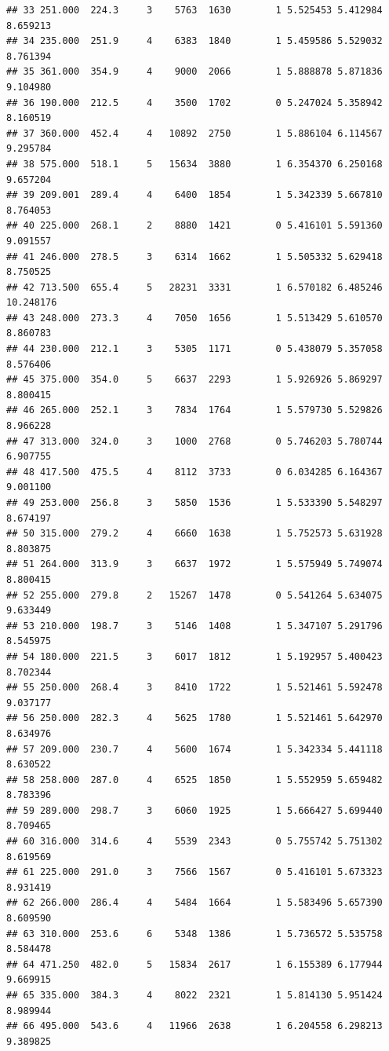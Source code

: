 \documentclass[
]{book}
\theoremstyle{definition}
\theoremstyle{definition}
\theoremstyle{definition}
\theoremstyle{definition}
\theoremstyle{remark}
\begin{document}
\begin{verbatim}
## 33 251.000  224.3     3    5763  1630        1 5.525453 5.412984  8.659213
## 34 235.000  251.9     4    6383  1840        1 5.459586 5.529032  8.761394
## 35 361.000  354.9     4    9000  2066        1 5.888878 5.871836  9.104980
## 36 190.000  212.5     4    3500  1702        0 5.247024 5.358942  8.160519
## 37 360.000  452.4     4   10892  2750        1 5.886104 6.114567  9.295784
## 38 575.000  518.1     5   15634  3880        1 6.354370 6.250168  9.657204
## 39 209.001  289.4     4    6400  1854        1 5.342339 5.667810  8.764053
## 40 225.000  268.1     2    8880  1421        0 5.416101 5.591360  9.091557
## 41 246.000  278.5     3    6314  1662        1 5.505332 5.629418  8.750525
## 42 713.500  655.4     5   28231  3331        1 6.570182 6.485246 10.248176
## 43 248.000  273.3     4    7050  1656        1 5.513429 5.610570  8.860783
## 44 230.000  212.1     3    5305  1171        0 5.438079 5.357058  8.576406
## 45 375.000  354.0     5    6637  2293        1 5.926926 5.869297  8.800415
## 46 265.000  252.1     3    7834  1764        1 5.579730 5.529826  8.966228
## 47 313.000  324.0     3    1000  2768        0 5.746203 5.780744  6.907755
## 48 417.500  475.5     4    8112  3733        0 6.034285 6.164367  9.001100
## 49 253.000  256.8     3    5850  1536        1 5.533390 5.548297  8.674197
## 50 315.000  279.2     4    6660  1638        1 5.752573 5.631928  8.803875
## 51 264.000  313.9     3    6637  1972        1 5.575949 5.749074  8.800415
## 52 255.000  279.8     2   15267  1478        0 5.541264 5.634075  9.633449
## 53 210.000  198.7     3    5146  1408        1 5.347107 5.291796  8.545975
## 54 180.000  221.5     3    6017  1812        1 5.192957 5.400423  8.702344
## 55 250.000  268.4     3    8410  1722        1 5.521461 5.592478  9.037177
## 56 250.000  282.3     4    5625  1780        1 5.521461 5.642970  8.634976
## 57 209.000  230.7     4    5600  1674        1 5.342334 5.441118  8.630522
## 58 258.000  287.0     4    6525  1850        1 5.552959 5.659482  8.783396
## 59 289.000  298.7     3    6060  1925        1 5.666427 5.699440  8.709465
## 60 316.000  314.6     4    5539  2343        0 5.755742 5.751302  8.619569
## 61 225.000  291.0     3    7566  1567        0 5.416101 5.673323  8.931419
## 62 266.000  286.4     4    5484  1664        1 5.583496 5.657390  8.609590
## 63 310.000  253.6     6    5348  1386        1 5.736572 5.535758  8.584478
## 64 471.250  482.0     5   15834  2617        1 6.155389 6.177944  9.669915
## 65 335.000  384.3     4    8022  2321        1 5.814130 5.951424  8.989944
## 66 495.000  543.6     4   11966  2638        1 6.204558 6.298213  9.389825

\end{verbatim}
\end{document}
